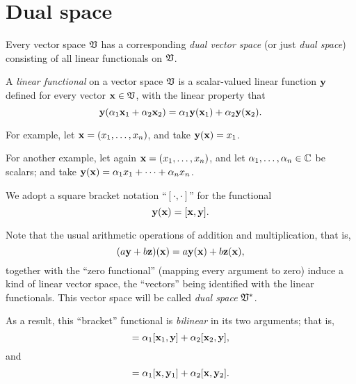 




\section{Dual space}
\label{2011-m-dvs}

Every vector space ${\frak V}$
has a corresponding {\em dual vector space}
(or just {\em dual space})
consisting of all linear functionals on ${\frak V}$.

A {\em linear functional}
on a vector space ${\frak V}$ is a scalar-valued linear function ${\bf y}$
defined for every vector   ${\bf x} \in {\frak V}$, with the linear property that
\begin{equation}
{\bf y} (\alpha_1 {\bf x}_1 +\alpha_2 {\bf x}_2)
=
\alpha_1 {\bf y} ({\bf x}_1) +\alpha_2 {\bf y} ({\bf x}_2) .
\end{equation}

{\color{blue}
\bexample
For example,
let ${\bf x} = (x_1,\ldots , x_n)$, and
take
${\bf y} ({\bf x}) =x_1$.

For another example,
let again ${\bf x} = (x_1,\ldots , x_n)$, and
let $\alpha_1,\ldots , \alpha_n \in {\Bbb C}$ be scalars; and
take
${\bf y} ({\bf x}) =\alpha_1 x_1 + \cdots +\alpha_n x_n$.
\eexample
}


We adopt a square bracket notation ``$[\cdot , \cdot ]$''
for the functional
\begin{equation}
{\bf y} ({\bf x})
=
[{\bf x},{\bf y}].
\end{equation}

Note that the usual arithmetic operations of addition and multiplication,
that is,
\begin{equation}
(a {\bf y} + b {\bf z}) ({\bf x})
=
a {\bf y} ({\bf x}) + b {\bf z} ({\bf x}) ,
\end{equation}
together with the ``zero functional''
(mapping every argument to zero)
induce a kind of linear vector space, the ``vectors''
being identified with the linear functionals.
This vector space will be called {\em dual space} ${\frak V}^*$.


As a result, this ``bracket'' functional is
{\em bilinear} in its two arguments; that is,
\begin{equation}
[ \alpha_1 {\bf x}_1 +\alpha_2 {\bf x}_2, {\bf y}]
=
\alpha_1 [{\bf x}_1 ,{\bf y}]  +\alpha_2  [{\bf x}_2,{\bf y}],
\end{equation}
and
\begin{equation}
[
{\bf x}, \alpha_1 {\bf y}_1 +\alpha_2 {\bf y}_2
]
=
\alpha_1
[{\bf x},{\bf y}_1 ]
+
\alpha_2
[{\bf x},{\bf y}_2].
\end{equation}


